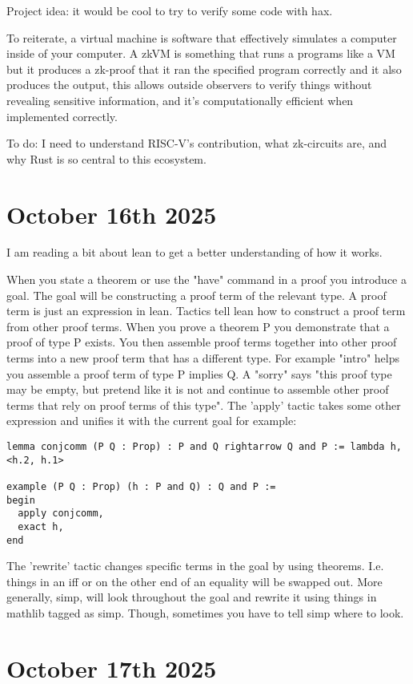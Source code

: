 \documentclass{amsart}
\theoremstyle{definition}
\begin{document}
Project idea: it would be cool to try to verify some code with hax.

To reiterate, a virtual machine is software that effectively simulates a computer inside of your computer. A zkVM is something that runs a programs like a VM but it produces a zk-proof that it ran the specified program correctly and it also produces the output, this allows outside observers to verify things without revealing sensitive information, and it's computationally efficient when implemented correctly.

To do: I need to understand RISC-V's contribution, what zk-circuits are, and why Rust is so central to this ecosystem.

\section{October 16th 2025}
I am reading a bit about lean to get a better understanding of how it works. 

When you state a theorem or use the "have" command in a proof you introduce a goal. The goal will be constructing a proof term of the relevant type. A proof term is just an expression in lean. Tactics tell lean how to construct a proof term from other proof terms. When you prove a theorem P you demonstrate that a proof of type P exists. You then assemble proof terms together into other proof terms into a new proof term that has a different type. For example "intro" helps you assemble a proof term of type P implies Q. A "sorry" says "this proof type may be empty, but pretend like it is not and continue to assemble other proof terms that rely on proof terms of this type". The 'apply' tactic takes some other expression and unifies it with the current goal for example:
\begin{verbatim}
lemma conjcomm (P Q : Prop) : P and Q rightarrow Q and P := lambda h, <h.2, h.1>

example (P Q : Prop) (h : P and Q) : Q and P :=
begin
  apply conjcomm,
  exact h,
end
\end{verbatim}
The 'rewrite' tactic changes specific terms in the goal by using theorems. I.e. things in an iff or on the other end of an equality will be swapped out. More generally, simp, will look throughout the goal and rewrite it using things in mathlib tagged as simp. Though, sometimes you have to tell simp where to look.

\section{October 17th 2025}
\end{document}

